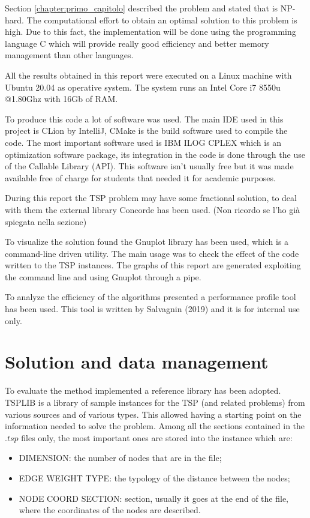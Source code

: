 Section \ref{chapter:primo_capitolo} described the problem and stated that is NP-hard. The computational effort to obtain an optimal solution to this problem is high. Due to this fact, the implementation will be done using the programming language C which will provide really good efficiency and better memory management than other languages.

All the results obtained in this report were executed on a Linux machine with Ubuntu 20.04 as operative system. The system runs an Intel Core i7 8550u @1.80Ghz with 16Gb of RAM.

To produce this code a lot of software was used. The main IDE used in this project is CLion by IntelliJ, CMake is the build software used to compile the code. The most important software used is IBM ILOG CPLEX which is an optimization software package, its integration in the code is done through the use of the Callable Library (API). This software isn’t usually free but it was made available free of charge for students that needed it for academic purposes.

During this report the TSP problem may have some fractional solution, to deal with them the external library Concorde has been used. (Non ricordo se l'ho già spiegata nella sezione)

To visualize the solution found the Gnuplot library has been used, which is a command-line driven utility. The main usage was to check the effect of the code written to the TSP instances. The graphs of this report are generated exploiting the command line and using Gnuplot through a pipe.

To analyze the efficiency of the algorithms presented a performance profile tool has been used. This tool is written by Salvagnin (2019) and it is for internal use only.

\section{Solution and data management}
\label{sec:solution-data-management}
To evaluate the method implemented a reference library has been adopted. TSPLIB \cite{tsp-lib} is a library of sample instances for the TSP (and related problems) from various sources and of various types. This allowed having a starting point on the information needed to solve the problem. Among all the sections contained in the $.tsp$ files only, the most important ones are stored into the instance which are:
\begin{itemize}
	\item DIMENSION: the number of nodes that are in the file;
	\item EDGE WEIGHT TYPE: the typology of the distance between the nodes;
	\item NODE COORD SECTION: section, usually it goes at the end of the file, where the coordinates of the nodes are described.
\end{itemize}

